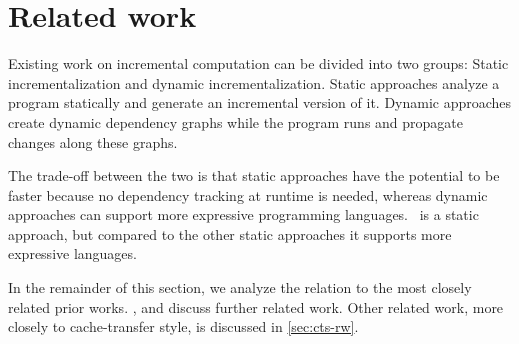 









\def\deriveDefCore{%
\begin{align*}
  \ensuremath{\Derive{\lambda (\Varid{x}\typcolon\sigma)\to \Varid{t}}} &= \ensuremath{\lambda (\Varid{x}\typcolon\sigma)\;(\Varid{dx}\typcolon\Delta \sigma)\to \Derive{\Varid{t}}} \\
  \ensuremath{\Derive{\Varid{s}\;\Varid{t}}} &= \ensuremath{\Derive{\Varid{s}}\;\Varid{t}\;\Derive{\Varid{t}}} \\
  \ensuremath{\Derive{\Varid{x}}} &= \ensuremath{\Varid{dx}} \\
  \ensuremath{\Derive{\Varid{c}}} &= \ensuremath{\DeriveConst{\Varid{c}}}
\end{align*}
}




\chapter{Related work}
\label{sec:rw}
\label{ch:incr-rw}

Existing work on incremental computation can be divided into two
groups: Static incrementalization and dynamic incrementalization.
Static approaches analyze a program statically and generate an incremental
version of it. Dynamic approaches create dynamic dependency graphs while
the program runs and propagate changes along these graphs.

The trade-off between the two is that static approaches have the potential
to be faster because no dependency tracking at runtime is needed, whereas
dynamic approaches can support more expressive programming languages.
%
\ILC\ is a static approach, but compared to the other static
approaches it supports more expressive languages.

In the remainder of this section, we analyze the relation to the
most closely related prior works. , \citet{Gupta99MMV}
and \citet{Acar06} discuss further related work.
Other related work, more closely to cache-transfer style, is
discussed in \cref{sec:cts-rw}.

